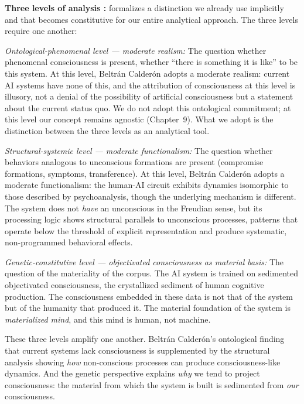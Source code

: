 \documentclass[acmlarge, nonacm]{acmart}
\begin{document}
\textbf{Three levels of analysis \cite{beltran2026}:} \citet{beltran2026} formalizes a distinction we already use implicitly and that becomes constitutive for our entire analytical approach. The three levels require one another:

\textit{Ontological-phenomenal level --- moderate realism:} The question whether phenomenal consciousness is present, whether ``there is something it is like'' to be this system. At this level, Beltrán Calderón adopts a moderate realism: current AI systems have none of this, and the attribution of consciousness at this level is illusory, not a denial of the possibility of artificial consciousness but a statement about the current status quo. We do not adopt this ontological commitment; at this level our concept remains agnostic (Chapter~9). What we adopt is the distinction between the three levels as an analytical tool.

\textit{Structural-systemic level --- moderate functionalism:} The question whether behaviors analogous to unconscious formations are present (compromise formations, symptoms, transference). At this level, Beltrán Calderón adopts a moderate functionalism: the human-AI circuit exhibits dynamics isomorphic to those described by psychoanalysis, though the underlying mechanism is different. The system does not \textit{have} an unconscious in the Freudian sense, but its processing logic shows structural parallels to unconscious processes, patterns that operate below the threshold of explicit representation and produce systematic, non-programmed behavioral effects.

\textit{Genetic-constitutive level --- objectivated consciousness as material basis:} The question of the materiality of the corpus. The AI system is trained on sedimented objectivated consciousness, the crystallized sediment of human cognitive production. The consciousness embedded in these data is not that of the system but of the humanity that produced it. The material foundation of the system is \textit{materialized mind}, and this mind is human, not machine.

These three levels amplify one another. Beltrán Calderón's ontological finding that current systems lack consciousness is supplemented by the structural analysis showing \textit{how} non-conscious processes can produce consciousness-like dynamics. And the genetic perspective explains \textit{why} we tend to project consciousness: the material from which the system is built is sedimented from \textit{our} consciousness.
\end{document}

